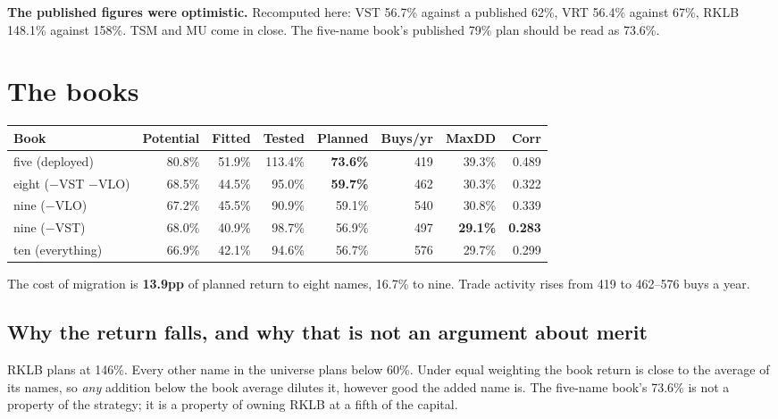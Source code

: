 \documentclass[11pt]{article}
\newcommand{\pc}[1]{#1\%}
\begin{document}
\textbf{The published figures were optimistic.} Recomputed here: VST \pc{56.7} against a
published \pc{62}, VRT \pc{56.4} against \pc{67}, RKLB \pc{148.1} against \pc{158}. TSM and MU
come in close. The five-name book's published \pc{79} plan should be read as \pc{73.6}.

\section{The books}

\begin{table}[H]\centering\small
\begin{tabular}{lrrrrrrr}
\toprule
\textbf{Book} & \textbf{Potential} & \textbf{Fitted} & \textbf{Tested} & \textbf{Planned} &
\textbf{Buys/yr} & \textbf{MaxDD} & \textbf{Corr} \\
\midrule
\rowcolor{bckeep}
five (deployed)      & 80.8\% & 51.9\% & 113.4\% & \textbf{73.6\%} & 419 & 39.3\% & 0.489 \\
eight ($-$VST $-$VLO)& 68.5\% & 44.5\% &  95.0\% & \textbf{59.7\%} & 462 & 30.3\% & 0.322 \\
nine ($-$VLO)        & 67.2\% & 45.5\% &  90.9\% & 59.1\%          & 540 & 30.8\% & 0.339 \\
nine ($-$VST)        & 68.0\% & 40.9\% &  98.7\% & 56.9\%          & 497 & \textbf{29.1\%} & \textbf{0.283} \\
ten (everything)     & 66.9\% & 42.1\% &  94.6\% & 56.7\%          & 576 & 29.7\% & 0.299 \\
\bottomrule
\end{tabular}
\end{table}

\noindent The cost of migration is \textbf{13.9pp} of planned return to eight names, \pc{16.7}
to nine. Trade activity rises from 419 to 462--576 buys a year.

\subsection*{Why the return falls, and why that is not an argument about merit}

RKLB plans at \pc{146}. Every other name in the universe plans below \pc{60}. Under equal
weighting the book return is close to the average of its names, so \emph{any} addition below the
book average dilutes it, however good the added name is. The five-name book's \pc{73.6} is not a
property of the strategy; it is a property of owning RKLB at a fifth of the capital.
\end{document}
